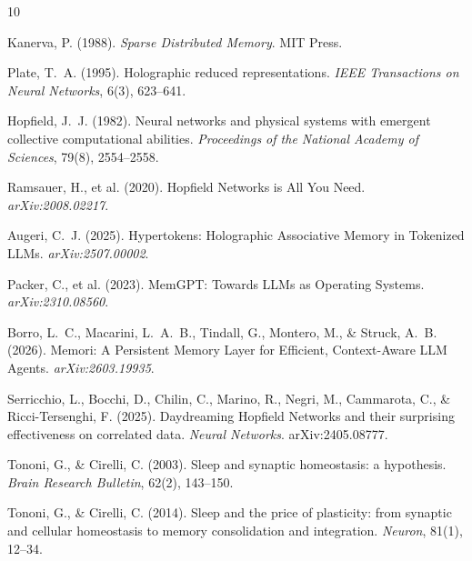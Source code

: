 \documentclass[11pt]{article}
\begin{document}

\begin{thebibliography}{10}

Kanerva, P. (1988).
\textit{Sparse Distributed Memory}.
MIT Press.

Plate, T.~A. (1995).
Holographic reduced representations.
\textit{IEEE Transactions on Neural Networks}, 6(3), 623--641.

Hopfield, J.~J. (1982).
Neural networks and physical systems with emergent collective computational
abilities.
\textit{Proceedings of the National Academy of Sciences}, 79(8), 2554--2558.

Ramsauer, H., et al. (2020).
Hopfield Networks is All You Need.
\textit{arXiv:2008.02217}.

Augeri, C.~J. (2025).
Hypertokens: Holographic Associative Memory in Tokenized LLMs.
\textit{arXiv:2507.00002}.

Packer, C., et al. (2023).
MemGPT: Towards LLMs as Operating Systems.
\textit{arXiv:2310.08560}.

Borro, L.~C., Macarini, L.~A.~B., Tindall, G., Montero, M., \& Struck, A.~B.
(2026).
Memori: A Persistent Memory Layer for Efficient, Context-Aware LLM Agents.
\textit{arXiv:2603.19935}.

Serricchio, L., Bocchi, D., Chilin, C., Marino, R., Negri, M., Cammarota, C.,
\& Ricci-Tersenghi, F. (2025).
Daydreaming Hopfield Networks and their surprising effectiveness on correlated
data.
\textit{Neural Networks}. arXiv:2405.08777.

Tononi, G., \& Cirelli, C. (2003).
Sleep and synaptic homeostasis: a hypothesis.
\textit{Brain Research Bulletin}, 62(2), 143--150.

Tononi, G., \& Cirelli, C. (2014).
Sleep and the price of plasticity: from synaptic and cellular homeostasis to
memory consolidation and integration.
\textit{Neuron}, 81(1), 12--34.

\end{thebibliography}
\end{document}
